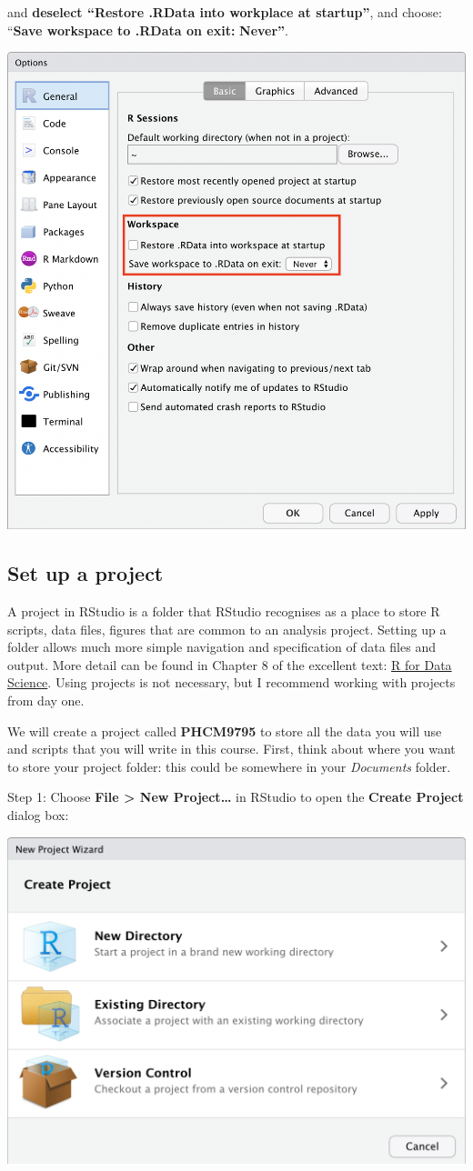 \documentclass[
]{memoir}
\begin{document}
and \textbf{deselect ``Restore .RData into workplace at startup''}, and choose: ``\textbf{Save workspace to .RData on exit:} \textbf{Never''}.

\includegraphics[width=0.75\linewidth]{img/RStudio-preferences}

\hypertarget{set-up-a-project}{%
\subsection{Set up a project}\label{set-up-a-project}}

A project in RStudio is a folder that RStudio recognises as a place to store R scripts, data files, figures that are common to an analysis project. Setting up a folder allows much more simple navigation and specification of data files and output. More detail can be found in Chapter 8 of the excellent text: \href{https://r4ds.had.co.nz/workflow-projects.html}{R for Data Science}. Using projects is not necessary, but I recommend working with projects from day one.

We will create a project called \textbf{PHCM9795} to store all the data you will use and scripts that you will write in this course. First, think about where you want to store your project folder: this could be somewhere in your \emph{Documents} folder.

Step 1: Choose \textbf{File \textgreater{} New Project\ldots{}} in RStudio to open the \textbf{Create Project} dialog box:

\includegraphics[width=0.75\linewidth]{img/NewProject-1}
\end{document}
